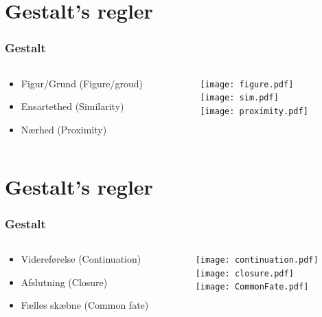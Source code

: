 \documentclass{beamer}
\begin{document}
\section{Gestalt's regler}
\begin{frame}
\frametitle{Gestalt}
  \begin{columns}[T]
    \begin{column}{.5\textwidth}
	  \begin{itemize}\setlength{\itemsep}{30pt}
		\item Figur/Grund (Figure/groud)
		\item Ensartethed (Similarity)
		\item Nærhed (Proximity)
	  \end{itemize}
    \end{column}
    \begin{column}{.5\textwidth}
      \texttt{[image: figure.pdf]}\\
      \texttt{[image: sim.pdf]}\\
      \texttt{[image: proximity.pdf]}
    \end{column}
  \end{columns}
\end{frame}


\section*{Gestalt's regler}
\begin{frame}
\frametitle{Gestalt}
  \begin{columns}[T]
    \begin{column}{.5\textwidth}
	  \begin{itemize}\setlength{\itemsep}{35pt}
		\item Videreførelse (Continuation)
		\item Afslutning (Closure)
		\item Fælles skæbne (Common fate)
	  \end{itemize}
    \end{column}
    \begin{column}{.5\textwidth}
      \texttt{[image: continuation.pdf]}\\
      \texttt{[image: closure.pdf]}\\
      \texttt{[image: CommonFate.pdf]}
    \end{column}
  \end{columns}
\end{frame}
\end{document}
